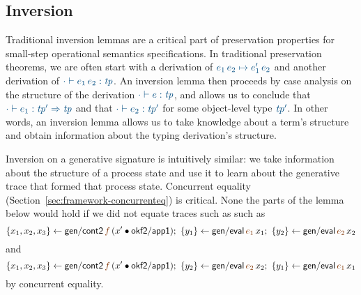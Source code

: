 \subsection{Inversion}\label{sec:inversion-genorder}

Traditional inversion lemmas are a critical part of preservation
properties for small-step operational semantics specifications. In 
traditional preservation theorems, we are often start with a derivation of
$\obj{e_1\,e_2 \mapsto e_1'\,e_2}$ and another derivation of
$\obj{\cdot \vdash e_1\,e_2 : {\it tp}}$. An inversion lemma then proceeds
by case analysis on the structure of the derivation 
$\obj{\cdot \vdash e : {\it tp}}$, and allows us to conclude that
$\obj{\cdot \vdash e_1 : {\it tp'} \Rightarrow {\it tp}}$
and that $\obj{\cdot \vdash e_2 : {\it tp'} }$ for some object-level
type $\obj{\it tp'}$.  In other words, an inversion lemma allows us to 
take knowledge about a term's structure and obtain information about 
the typing derivation's structure. 

Inversion on a generative signature is intuitively similar: we take
information about the structure of a process state and use it to learn
about the generative trace that formed that process state. Concurrent
equality (Section~\ref{sec:framework-concurrenteq}) is critical.
None the parts of the lemma below would hold if we did not
equate traces such as such as
\[
\trstep{x_1, x_2, x_3}{{\sf gen/cont2}\,\lf{f}\,(x' \fuse {\sf okf2/app1})}; ~
\trstep{y_1}{{\sf gen/eval}\,\lf{e_1}\,x_1}; ~
\trstep{y_2}{{\sf gen/eval}\,\lf{e_2}\,x_2}
\]and\[
\trstep{x_1, x_2, x_3}{{\sf gen/cont2}\,\lf{f}\,(x' \fuse {\sf okf2/app1})}; ~
\trstep{y_2}{{\sf gen/eval}\,\lf{e_2}\,x_2}; ~
\trstep{y_1}{{\sf gen/eval}\,\lf{e_1}\,x_1}
\]
by concurrent equality.

